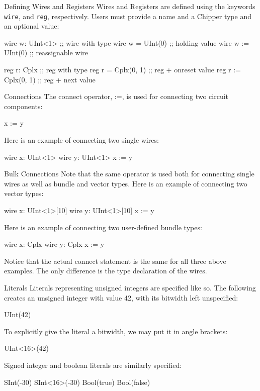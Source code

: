 \documentclass[xcolor=pdflatex,dvipsnames,table]{beamer}
\begin{document}
\begin{frame}[fragile]{Defining Wires and Registers}
Wires and Registers are defined using the keywords \verb+wire+, and \verb+reg+, respectively. Users must provide a name and a Chipper type and an optional value:
\begin{stanza}
wire w: UInt<1>     ;; wire with type
wire w = UInt(0)    ;; holding value
wire w := UInt(0)   ;; reassignable wire
\end{stanza}
\begin{stanza}
reg r: Cplx         ;; reg with type
reg r = Cplx(0, 1)  ;; reg + onreset value
reg r := Cplx(0, 1) ;; reg + next value
\end{stanza}

\end{frame}

\begin{frame}[fragile]{Connections}
The connect operator, :=, is used for connecting two circuit components:
\begin{stanza}
x := y
\end{stanza}
Here is an example of connecting two single wires:
\begin{stanza}
wire x: UInt<1>
wire y: UInt<1>
x := y
\end{stanza}
\end{frame}

\begin{frame}[fragile]{Bulk Connections}
Note that the same operator is used both for connecting single wires as well as bundle and vector types.  Here is an example of connecting two vector types:
\begin{stanza}  
wire x: UInt<1>[10]
wire y: UInt<1>[10]
x := y
\end{stanza}
Here is an example of connecting two user-defined bundle types:
\begin{stanza}  
wire x: Cplx
wire y: Cplx
x := y
\end{stanza}
Notice that the actual connect statement is the same for all three above examples. The only difference is the type declaration of the wires.
\end{frame}

\begin{frame}[fragile]{Literals}
Literals representing unsigned integers are specified like so. The following creates an unsigned integer with value 42, with its bitwidth left unspecified:
\begin{stanza}
UInt(42)
\end{stanza}  
To explicitly give the literal a bitwidth, we may put it in angle brackets:
\begin{stanza}
UInt<16>(42)  
\end{stanza}  
Signed integer and boolean literals are similarly specified:
\begin{stanza}
SInt(-30)
SInt<16>(-30)  
Bool(true)
Bool(false)
\end{stanza}
\end{frame}
\end{document}
